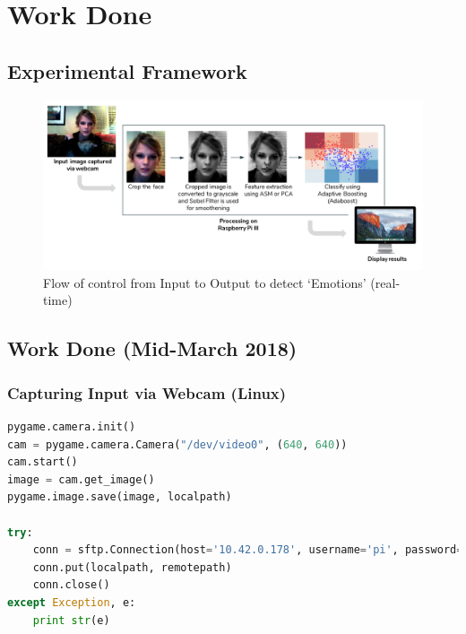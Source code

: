 \chapter{Work Done}

\section{Experimental Framework}

\begin{figure}[htb]
\centering
\includegraphics[scale=0.35]{images/model}
\caption{Flow of control from Input to Output to detect `Emotions' (real-time)}
\label{fig:model}
\end{figure}

\section{Work Done (Mid-March 2018)}

\subsection{Capturing Input via Webcam (Linux)}
\begin{lstlisting}[language=python]
pygame.camera.init()
cam = pygame.camera.Camera("/dev/video0", (640, 640))
cam.start()
image = cam.get_image()
pygame.image.save(image, localpath)

try:
    conn = sftp.Connection(host='10.42.0.178', username='pi', password='raspberry')
    conn.put(localpath, remotepath)
    conn.close()
except Exception, e:
    print str(e)
\end{lstlisting}

